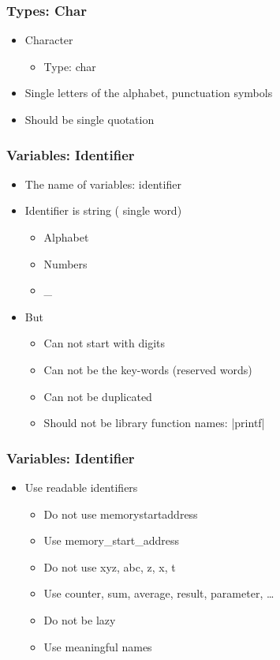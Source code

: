 \documentclass{../c-lecture}
\begin{document}
\begin{frame}
  \frametitle{Types: Char}
  \begin{itemize}
    \item Character
    \begin{itemize}
      \item Type: char
    \end{itemize}
    \item Single letters of the alphabet, punctuation symbols
    \item Should be single quotation
  \end{itemize}
\end{frame}

\begin{frame}
  \frametitle{Variables: Identifier}
  \begin{itemize}
    \item
      The name of variables: {\color{Orange} identifier}
    \item
      Identifier is string ({\color{Green} single word})
    \begin{itemize}
      \item Alphabet
      \item Numbers
      \item _
    \end{itemize}
    \item But
    \begin{itemize}
      \item Can {\color{Cyan} not} start with digits
      \item
        Can {\color{Cyan} not} be the key-words (reserved
        words)
      \item Can {\color{Cyan} not} be duplicated
      \item
        Should {\color{Cyan} not} be library function names:
        |printf|
    \end{itemize}
  \end{itemize}
\end{frame}

\begin{frame}
  \frametitle{Variables: Identifier}
  \begin{itemize}
    \item Use readable identifiers
    \begin{itemize}
      \item Do not use memorystartaddress
      \item Use memory_start_address
      \item Do not use xyz, abc, z, x, t
      \item Use counter, sum, average, result, parameter, \ldots
      \item Do not be lazy
      \item Use meaningful names
    \end{itemize}
  \end{itemize}
\end{frame}
\end{document}

